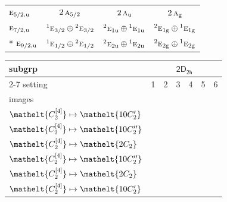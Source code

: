 \documentclass[10pt,a4paper]{article}
\numberwithin{equation}{section}
\newcommand{\eltfont}[1]{{\let\sigma\eltsigma\mathelt{#1}}}
\newcommand{\grp}[1]{\mathsf{#1}}
\newcommand{\irr}[1]{\text{\normalfont\scshape #1}}
\newcommand{\conjpair}[1]{{}^{#1}}
\newcommand{\cls}[1]{\eltfont{#1}}
\newcommand{\ptag}[1]{\mathrm{#1}}
\newcommand{\genidx}[2]{#1^{[\mathrm{#2}]}}
\begin{document}
{\begin{longtable}{@{}lccc@{}}
$\irr{e}_{5/2,\ptag{u}}$ & $2\,\irr{a}_{5/2}$ & $2\,\irr{a}_{\ptag{u}}$ & $2\,\irr{a}_{\ptag{g}}$\\
$\irr{e}_{7/2,\ptag{u}}$ & $\conjpair{1}\irr{e}_{3/2}\oplus \conjpair{2}\irr{e}_{3/2}$ & $\conjpair{2}\irr{e}_{1\ptag{u}}\oplus \conjpair{1}\irr{e}_{1\ptag{u}}$ & $\conjpair{2}\irr{e}_{1\ptag{g}}\oplus \conjpair{1}\irr{e}_{1\ptag{g}}$\\*
$\irr{e}_{9/2,\ptag{u}}$ & $\conjpair{1}\irr{e}_{1/2}\oplus \conjpair{2}\irr{e}_{1/2}$ & $\conjpair{2}\irr{e}_{2\ptag{u}}\oplus \conjpair{1}\irr{e}_{2\ptag{u}}$ & $\conjpair{2}\irr{e}_{2\ptag{g}}\oplus \conjpair{1}\irr{e}_{2\ptag{g}}$\\
\bottomrule\end{longtable}}
{\small\begin{longtable}{@{}lcccccc@{}}\toprule
subgrp & \multicolumn{6}{c}{\href{2D2h.pdf}{$\grp{2D_{2h}}$}}\\\cmidrule(lr){2-7}
setting & 1 & 2 & 3 & 4 & 5 & 6\\
images & {\scriptsize\begin{tabular}[t]{@{}c@{}}$\cls{\genidx{C_{2}}{2}} \mapsto \cls{2C_{2}}$\\$\cls{\genidx{C_{2}}{4}} \mapsto \cls{10C_{2}'}$\end{tabular}} & {\scriptsize\begin{tabular}[t]{@{}c@{}}$\cls{\genidx{C_{2}}{2}} \mapsto \cls{2C_{2}}$\\$\cls{\genidx{C_{2}}{4}} \mapsto \cls{10C_{2}''}$\end{tabular}} & {\scriptsize\begin{tabular}[t]{@{}c@{}}$\cls{\genidx{C_{2}}{2}} \mapsto \cls{10C_{2}'}$\\$\cls{\genidx{C_{2}}{4}} \mapsto \cls{2C_{2}}$\end{tabular}} & {\scriptsize\begin{tabular}[t]{@{}c@{}}$\cls{\genidx{C_{2}}{2}} \mapsto \cls{10C_{2}'}$\\$\cls{\genidx{C_{2}}{4}} \mapsto \cls{10C_{2}''}$\end{tabular}} & {\scriptsize\begin{tabular}[t]{@{}c@{}}$\cls{\genidx{C_{2}}{2}} \mapsto \cls{10C_{2}''}$\\$\cls{\genidx{C_{2}}{4}} \mapsto \cls{2C_{2}}$\end{tabular}} & {\scriptsize\begin{tabular}[t]{@{}c@{}}$\cls{\genidx{C_{2}}{2}} \mapsto \cls{10C_{2}''}$\\$\cls{\genidx{C_{2}}{4}} \mapsto \cls{10C_{2}'}$\end{tabular}}\\\midrule\endhead

\end{longtable}}
\end{document}
